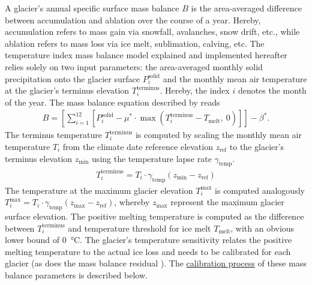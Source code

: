         A glacier's annual specific surface mass balance $B$ is the area-averaged difference between accumulation and ablation over the course of a year. Hereby, accumulation refers to mass gain via snowfall, avalanches, snow drift, etc., while ablation refers to mass loss via ice melt, sublimation, calving, etc. The temperature index mass balance model explained and implemented hereafter relies solely on two input parameters: the area-averaged monthly solid precipitation onto the glacier surface $P_i^\text{solid}$ and the monthly mean air temperature at the glacier's terminus elevation $T_i^\text{terminus}$. Hereby, the index $i$ denotes the month of the year. The mass balance equation described by \citet{Marzeion2012b} reads
        \begin{align}
            \label{eq:mass-balance}
            B = \left[\sum_{i=1}^{12}\left[
                    P_i^\text{solid}  - \mu^* \cdot \max\left(T_{i}^\text{terminus} - T_\text{melt},\ 0\right)
                \right]\right] - \beta^*.
        \end{align}
        The terminus temperature $T_{i}^\text{terminus}$ is computed by scaling the monthly mean air temperature $T_i$ from the climate date reference elevation $z_\text{ref}$ to the glacier's terminus elevation $z_\text{min}$ using the temperature lapse rate $\gamma_\text{temp}$.
        \begin{align}
            T_i^\text{terminus} = T_i \cdot \gamma_\text{temp} (z_\text{min} - z_\text{ref})
        \end{align}
        The temperature at the maximum glacier elevation $T_{i}^\text{max}$ is computed analogously $T_{i}^\text{max} = T_i \cdot \gamma_\text{temp} (z_\text{max} - z_\text{ref})$, whereby $z_\text{max}$ represent the maximum glacier surface elevation. The positive melting temperature is computed as the difference between $T_{i}^\text{terminus}$ and temperature threshold for ice melt $T_\text{melt}$, with an obvious lower bound of \SI{0}{\celsius}. The glacier's temperature sensitivity \mustar{} relates the positive melting temperature to the actual ice loss and needs to be calibrated for each glacier (as does the mass balance residual \bias{}). The \hyperref[ssub:mb_calib]{calibration process} of these mass balance parameters is described below.
        
